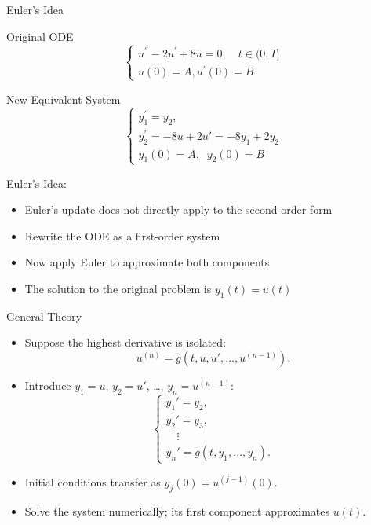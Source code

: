 \documentclass[10pt]{beamer}
\begin{document}
\begin{frame}{Euler's Idea}

\begin{block}{Original ODE}
    $$
    \begin{cases}
    u^{''}- 2 u^\prime + 8 u  = 0, \quad t \in (0,T]\\
    u(0) = A, u^\prime(0) = B
    \end{cases}
    $$
\end{block}

\begin{block}{New Equivalent System}
    \[
    \begin{cases}
    y_1^\prime = y_2, \\
    y_2^\prime = -8u+2u'=-8y_1+2y_2\\
    y_1(0)=A,\;\; y_2(0)=B
    \end{cases}
    \]
\end{block}

Euler's Idea:
\begin{itemize}
    \item Euler's update does not directly apply to the second-order form
    \item Rewrite the ODE as a first-order system 
    \item Now apply Euler to approximate both components 
    \item The solution to the original problem is $y_1(t) = u(t)$
\end{itemize}
    
\end{frame}

\begin{frame}{General Theory}
\begin{itemize}
    \item Suppose the highest derivative is isolated:
    \[u^{(n)}=g(t,u,u',\ldots,u^{(n-1)}).\]
    \item Introduce $y_1=u$, $y_2=u'$, \ldots, $y_n=u^{(n-1)}$:
    \[
    \begin{cases}
    y_1'=y_2,\\
    y_2'=y_3,\\
    \quad\vdots\\
    y_n'=g(t,y_1,\ldots,y_n).
    \end{cases}
    \]
    \item Initial conditions transfer as $y_j(0)=u^{(j-1)}(0)$.
    \item Solve the system numerically; its first component approximates $u(t)$.
\end{itemize}


\end{frame}
\end{document}
